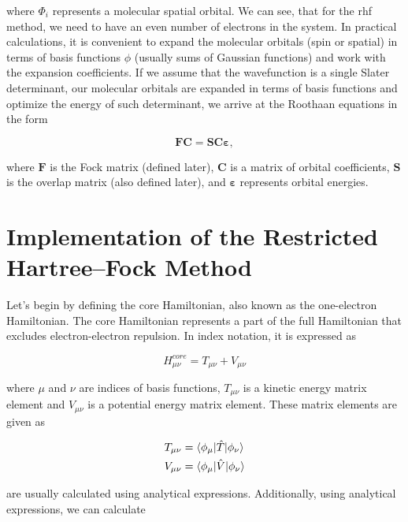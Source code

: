 \documentclass[open=any,parskip=half,11pt]{scrbook}
\begin{document}
where \(\Phi_i\) represents a molecular spatial orbital. We can see, that for the \acrshort{rhf} method, we need to have an even number of electrons in the system. In practical calculations, it is convenient to expand the molecular orbitals (spin or spatial) in terms of basis functions \(\phi\) (usually sums of Gaussian functions) and work with the expansion coefficients. If we assume that the wavefunction is a single Slater determinant, our molecular orbitals are expanded in terms of basis functions and optimize the energy of such determinant, we arrive at the Roothaan equations in the form

\begin{equation}\label{eq:roothaan}
\mathbf{FC}=\mathbf{SC\varepsilon},
\end{equation}

where \(\mathbf{F}\) is the Fock matrix (defined later), \(\mathbf{C}\) is a matrix of orbital coefficients, \(\mathbf{S}\) is the overlap matrix (also defined later), and \(\mathbf{\varepsilon}\) represents orbital energies.

\section{Implementation of the Restricted Hartree--Fock Method}\label{implementation-of-the-restricted-hartreefock-method}

Let's begin by defining the core Hamiltonian, also known as the one-electron Hamiltonian. The core Hamiltonian represents a part of the full Hamiltonian that excludes electron-electron repulsion. In index notation, it is expressed as

\begin{equation}\label{eq:hamiltonian}
H_{\mu\nu}^{core}=T_{\mu\nu}+V_{\mu\nu}
\end{equation}

where \(\mu\) and \(\nu\) are indices of basis functions, \(T_{\mu\nu}\) is a kinetic energy matrix element and \(V_{\mu\nu}\) is a potential energy matrix element. These matrix elements are given as

\begin{align}
T_{\mu\nu}&=\braket{\phi_{\mu}|\hat{T}|\phi_{\nu}} \\
V_{\mu\nu}&=\braket{\phi_{\mu}|\hat{V}|\phi_{\nu}}
\end{align}

are usually calculated using analytical expressions. Additionally, using analytical expressions, we can calculate
\end{document}
